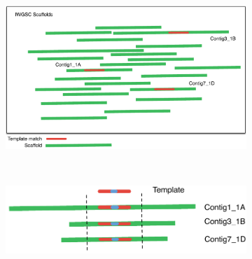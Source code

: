 \begin{figure}
    \begin{subfigure}[b]{0.4\textwidth}
        \includegraphics[width=1\textwidth]{PolyMarker/Figures/aln/scaffoldsSearch.pdf}
        \caption{}
        \label{fig:poly:globalSearch}
    \end{subfigure}
    ~ %
    \begin{subfigure}[b]{0.4\textwidth}
        \raisebox{10mm} { \includegraphics[width=1\textwidth]{PolyMarker/Figures/aln/scaffoldsFoundAround.pdf} }
        \caption{}
        \label{fig:poly:globalAround} 
    \end{subfigure}
    

\end{figure}
